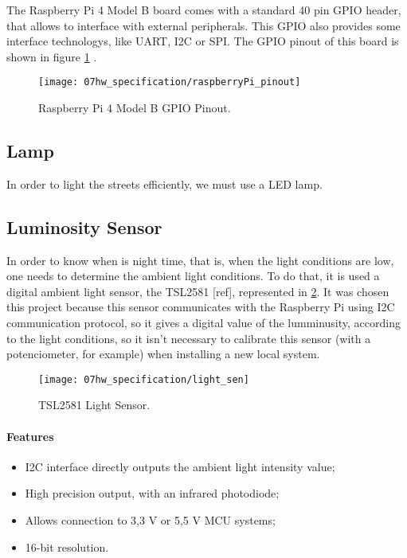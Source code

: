 The Raspberry Pi 4 Model B board comes with a standard 40 pin GPIO header, that allows to interface with external peripherals. This GPIO also provides some interface technologys, like UART, I2C or SPI. The GPIO pinout of this board is shown in figure \ref{fig:rasp_pinout} \cite{pinout}.

\begin{figure}[ht]
	\centering
	\texttt{[image: 07hw\_specification/raspberryPi\_pinout]}
	\caption{Raspberry Pi 4 Model B GPIO Pinout.}
	\label{fig:rasp_pinout}
\end{figure}

\subsection{Lamp}

In order to light the streets efficiently, we must use a LED lamp. 

\subsection{Luminosity Sensor}

In order to know when is night time, that is, when the light conditions are low, one needs to determine the ambient light conditions. To do that, it is used a digital ambient light sensor, the TSL2581 [ref], represented in \ref{fig:light_sen}. It was chosen this project because this sensor communicates with the Raspberry Pi using I2C communication protocol, so it gives a digital value of the lumminusity, according to the light conditions, so it isn't necessary to calibrate this sensor (with a potenciometer, for example) when installing a new local system.

\begin{figure}[ht]
	\centering
	\texttt{[image: 07hw\_specification/light\_sen]}
	\caption{TSL2581 Light Sensor.}
	\label{fig:light_sen}
\end{figure}

\paragraph*{Features}
\begin{itemize}
	\item I2C interface directly outputs the ambient light intensity value;
	\item High precision output, with an infrared photodiode;
	\item Allows connection to 3,3 V or 5,5 V MCU systems;
	\item 16-bit resolution.
\end{itemize}

